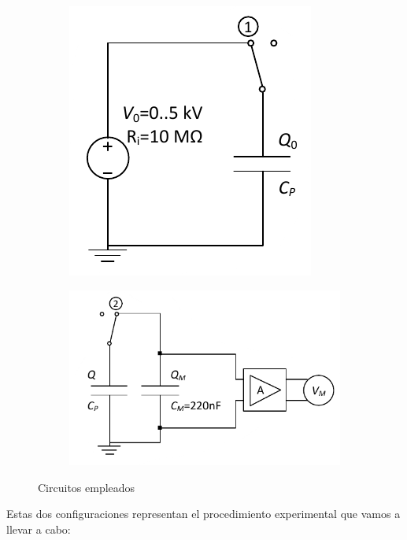 \documentclass[a4paper,12pt,titlepage]{article}
\begin{document}
\begin{figure}[h!]
    \centering
    \begin{subfigure}{0.45\textwidth}
        \centering
        \includegraphics[width=0.65\linewidth]{conf1.png}
    \end{subfigure}
    \begin{subfigure}{0.45\textwidth}
        \centering
        \includegraphics[width=0.95\linewidth]{conf2.png}
    \end{subfigure}
    \caption{Circuitos empleados}
    \label{Material}
\end{figure}

Estas dos configuraciones representan el procedimiento experimental que vamos a llevar a cabo:
\end{document}
